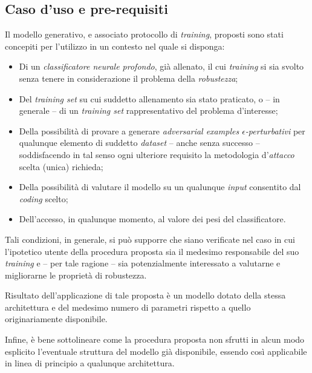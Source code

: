 \documentclass[a4paper, twoside]{article}
\begin{document}
\subsection{Caso d'uso e pre-requisiti}

Il modello generativo, e associato protocollo di \textit{training}, proposti sono stati concepiti per l'utilizzo in un contesto nel quale si disponga:

\begin{itemize}
	\item {Di un \textit{classificatore neurale profondo}, già allenato, il cui \textit{training} si sia svolto senza tenere in considerazione il problema della \textit{robustezza};}

	\item {Del \textit{training set} su cui suddetto allenamento sia stato praticato, o -- in generale -- di un \textit{training set} rappresentativo del problema d'interesse;}

	\item {Della possibilità di provare a generare \textit{adversarial examples $\epsilon$-perturbativi} per qualunque elemento di suddetto \textit{dataset} -- anche senza successo -- soddisfacendo in tal senso ogni ulteriore requisito la metodologia d'\textit{attacco} scelta (unica) richieda;}

	\item {Della possibilità di valutare il modello su un qualunque \textit{input} consentito dal \textit{coding} scelto;}

	\item {Dell'accesso, in qualunque momento, al valore dei pesi del classificatore.}

\end{itemize}

Tali condizioni, in generale, si può supporre che siano verificate nel caso in cui l'ipotetico utente della procedura proposta sia il medesimo responsabile del suo \textit{training} e -- per tale ragione -- sia potenzialmente interessato a valutarne e migliorarne le proprietà di robustezza.

Risultato dell'applicazione di tale proposta è un modello dotato della stessa architettura e del medesimo numero di parametri rispetto a quello originariamente disponibile.

Infine, è bene sottolineare come la procedura proposta non sfrutti in alcun modo esplicito l'eventuale struttura del modello già disponibile, essendo così applicabile in linea di principio a qualunque architettura.
\end{document}
